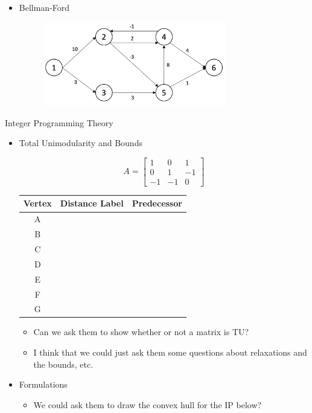 \documentclass[12pt]{exam}
\begin{document}
\begin{itemize}
	\item Bellman-Ford
\begin{figure}[h]
	\center
	\includegraphics[width=8cm]{BellmanFordFigure}
	\end{figure}
\end{itemize}

Integer Programming Theory
\begin{itemize}
	\item Total Unimodularity and Bounds

\[ A =
\begin{bmatrix}
    1     & 0 &  1   \\
      0     & 1 & -1 \\
    -1       & -1 &  0  

\end{bmatrix}
\]


\begin{center}
\begin{tabular}{|c|c|c|}
\hline
Vertex &  Distance Label	&	Predecessor \\ \hline
A &  &  \\ \hline
B & & \\ \hline
C & & \\ \hline
D & & \\ \hline
E & & \\ \hline
F & & \\ \hline
G &  &  \\
\hline		
\end{tabular}
\end{center}


	\begin{itemize}
		\item Can we ask them to show whether or not a matrix is TU?
		\item I think that we could just ask them some questions about relaxations and the bounds, etc.

	\end{itemize}
	\item Formulations
	
	\begin{itemize}
		\item We could ask them to draw the convex hull for the IP below?


\end{itemize}
\end{itemize}
\end{document}
